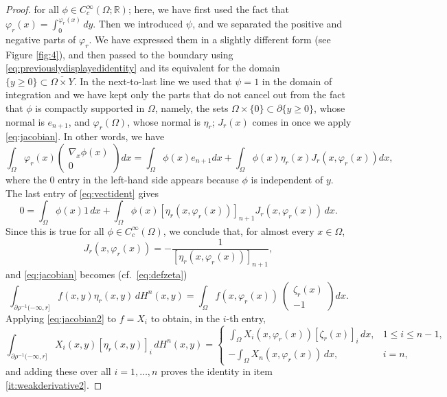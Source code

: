 \documentclass[10pt,a4paper]{amsart}
\newcommand{\R}{\mathbb{R}}
\begin{document}
\begin{proof}
  for all $\phi\in C^\infty_c(\Omega;\R)$; here, we have first used the fact that $\varphi_r(x)=\int_0^{\varphi_r(x)}dy$. Then we introduced $\psi$, and we separated the positive and negative parts of $\varphi_r$. We have expressed them in a slightly different form (see Figure \ref{fig:4}), and then passed to the boundary using \eqref{eq:previouslydisplayedidentity} and its equivalent for the domain $\{y\geq 0\}\subset \overline{\Omega\times Y}$. In the next-to-last line we used that $\psi=1$ in the  domain of integration and we have kept only the parts that do not cancel out from the fact that $\phi$ is compactly supported in $\Omega$, namely, the sets $\Omega\times \{0\}\subset\partial\{y\geq 0\}$, whose normal is $e_{n+1}$,  and  $\varphi_r(\Omega)$, whose normal is $\eta_r$;  $J_r(x)$ comes in %
  once we apply \eqref{eq:jacobian}.
  In other words, we have
  \begin{equation}\label{eq:vectident}
   \int_\Omega\varphi_r(x)\begin{pmatrix}\nabla_x \phi(x)\\0\end{pmatrix}dx
   =\int_\Omega\phi(x)e_{n+1}dx+\int_\Omega\phi(x)\eta_r(x)J_r(x,\varphi_r(x))dx,%
  \end{equation}
  where the 0 entry in the left-hand side appears because $\phi$ is independent of $y$.
  The last entry of \eqref{eq:vectident} gives
  \[0=\int_\Omega\phi(x)1\,dx+\int_\Omega \phi(x)[\eta_r(x,\varphi_r(x))]_{n+1}J_r(x,\varphi_r(x))\,dx.\]
  Since this is true for all $\phi\in C^\infty_c(\Omega)$, we conclude that, for almost every $x\in\Omega$, \[J_r(x,\varphi_r(x))=-\frac1{[\eta_r(x,\varphi_r(x))]_{n+1}},\]
  and \eqref{eq:jacobian} becomes (cf.~\eqref{eq:defzeta})
  \begin{equation}\label{eq:jacobian2}
  \int_{\partial\rho^{-1}(-\infty,r]}f(x,y)\eta_r(x,y)\,dH^n(x,y)=\int_{\Omega}f(x,\varphi_r(x))\
  \begin{pmatrix}
   \zeta_r(x)\\-1
  \end{pmatrix}dx.
  \end{equation}
  Applying \eqref{eq:jacobian2} to $f=X_i$ to obtain, in the $i$-th entry,
  \begin{equation*}%
  \int_{\partial\rho^{-1}(-\infty,r]}X_i(x,y)[\eta_r(x,y)]_i\,dH^n(x,y)=\begin{cases}\int_{\Omega}X_i(x,\varphi_r(x))
   [\zeta_r(x)]_i\,dx,& 1\leq i\leq n-1,\\
   -\int_{\Omega}X_n(x,\varphi_r(x))
   \,dx,&i=n,
   \end{cases}
  \end{equation*}  
  and adding these over all $i=1,\dots, n$ proves the identity in item \ref{it:weakderivative2}.
 

\end{proof}
\end{document}
